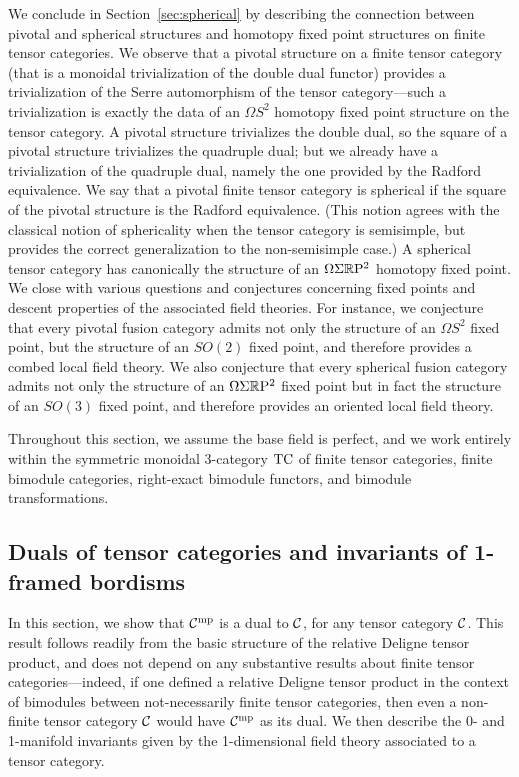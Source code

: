 \documentclass{amsart}
\begin{document}
We conclude in Section~\ref{sec:spherical} by describing the connection between pivotal and spherical structures and homotopy fixed point structures on finite tensor categories.  We observe that a pivotal structure on a finite tensor category (that is a monoidal trivialization of the double dual functor) provides a trivialization of the Serre automorphism of the tensor category---such a trivialization is exactly the data of an $\Omega S^2$ homotopy fixed point structure on the tensor category.  A pivotal structure trivializes the double dual, so the square of a pivotal structure trivializes the quadruple dual; but we already have a trivialization of the quadruple dual, namely the one provided by the Radford equivalence.  We say that a pivotal finite tensor category is spherical if the square of the pivotal structure is the Radford equivalence.  (This notion agrees with the classical notion of sphericality when the tensor category is semisimple, but provides the correct generalization to the non-semisimple case.)  A spherical tensor category has canonically the structure of an $\Omega \Sigma \mathbb R \mathrm{P}^2$ homotopy fixed point.  We close with various questions and conjectures concerning fixed points and descent properties of the associated field theories.  For instance, we conjecture that every pivotal fusion category admits not only the structure of an $\Omega S^2$ fixed point, but the structure of an $SO(2)$ fixed point, and therefore provides a combed local field theory.  We also conjecture that every spherical fusion category admits not only the structure of an $\Omega \Sigma \mathbb R \mathrm{P}^2$ fixed point but in fact the structure of an $SO(3)$ fixed point, and therefore provides an oriented local field theory.

Throughout this section, we assume the base field is perfect, and we work entirely within the symmetric monoidal 3-category $\mathrm{TC}$ of finite tensor categories, finite bimodule categories, right-exact bimodule functors, and bimodule transformations.



\subsection{Duals of tensor categories and invariants of 1-framed bordisms} \label{sec:df-objects}


In this section, we show that $\mathcal C^{\mathrm{mp}}$ is a dual to $\mathcal C$, for any tensor category $\mathcal C$.  This result follows readily from the basic structure of the relative Deligne tensor product, and does not depend on any substantive results about finite tensor categories---indeed, if one defined a relative Deligne tensor product in the context of bimodules between not-necessarily finite tensor categories, then even a non-finite tensor category $\mathcal C$ would have $\mathcal C^{\mathrm{mp}}$ as its dual.  We then describe the 0- and 1-manifold invariants given by the 1-dimensional field theory associated to a tensor category.
\end{document}

